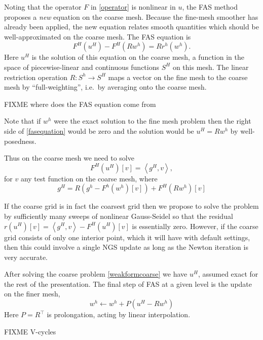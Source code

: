 \documentclass[letterpaper,final,12pt,reqno]{amsart}
\newcommand{\ip}[2]{\left<#1,#2\right>}
\begin{document}
Noting that the operator $F$ in \eqref{operator} is nonlinear in $u$, the FAS method  proposes a \emph{new} equation on the coarse mesh.  Because the fine-mesh smoother has already been applied, the new equation relates smooth quantities which should be well-approximated on the coarse mesh.  The FAS equation is
\begin{equation}
  F^H(u^H) - F^H(R w^h) = R r^h(w^h). \label{fasequation}
\end{equation}
Here $u^H$ is the solution of this equation on the coarse mesh, a function in the space of piecewise-linear and continuous functions $S^H$ on this mesh.  The linear restriction operation $R:S^h \to S^H$ maps a vector on the fine mesh to the coarse mesh by ``full-weighting'', i.e.~by averaging onto the coarse mesh.

FIXME where does the FAS equation come from

Note that if $w^h$ were the exact solution to the fine mesh problem then the right side of \eqref{fasequation} would be zero and the solution would be $u^H = R w^h$ by well-posedness.

Thus on the coarse mesh we need to solve
\begin{equation}
  F^H(u^H)[v] = \ip{g^H}{v},  \label{weakformcoarse}
\end{equation}
for $v$ any test function on the coarse mesh, where
  $$g^H = R (g^h - F^h(w^h)[v]) + F^H(R w^h)[v]$$

If the coarse grid is in fact the coarsest grid then we propose to solve the problem by sufficiently many sweeps of nonlinear Gauss-Seidel so that the residual $r(u^H)[v] = \ip{g^H}{v} - F^H(u^H)[v]$ is essentially zero.  However, if the coarse grid consists of only one interior point, which it will have with default settings, then this could involve a single NGS update as long as the Newton iteration is very accurate.

After solving the coarse problem \eqref{weakformcoarse} we have $u^H$, assumed exact for the rest of the presentation.  The final step of FAS at a given level is the update on the finer mesh,
\begin{equation}
  w^h \longleftarrow w^h + P(u^H - R w^h) \label{fasupdate}
\end{equation}
Here $P=R^\top$ is prolongation, acting by linear interpolation.

FIXME V-cycles

\small

\bigskip


\end{document}
